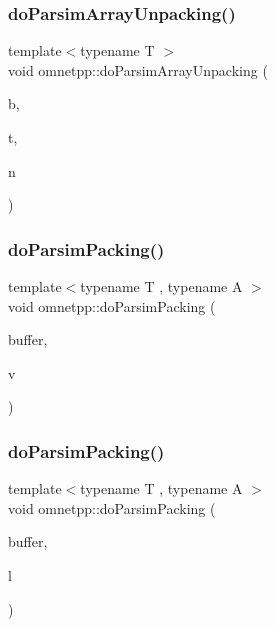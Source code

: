\mbox{\label{namespaceomnetpp_aace4e02d3cd181249cf81a4bf8827fa7}} 
\subsubsection{\texorpdfstring{do\+Parsim\+Array\+Unpacking()}{doParsimArrayUnpacking()}}
{\footnotesize\ttfamily template$<$typename T $>$ \\
void omnetpp\+::do\+Parsim\+Array\+Unpacking (\begin{DoxyParamCaption}\item[{omnetpp\+::c\+Comm\+Buffer $\ast$}]{b,  }\item[{T $\ast$}]{t,  }\item[{int}]{n }\end{DoxyParamCaption})}

\mbox{\label{namespaceomnetpp_aa55507da29724bc32cb1377349b22c87}} 
\subsubsection{\texorpdfstring{do\+Parsim\+Packing()}{doParsimPacking()}\hspace{0.1cm}{\footnotesize\ttfamily [1/5]}}
{\footnotesize\ttfamily template$<$typename T , typename A $>$ \\
void omnetpp\+::do\+Parsim\+Packing (\begin{DoxyParamCaption}\item[{omnetpp\+::c\+Comm\+Buffer $\ast$}]{buffer,  }\item[{const std\+::vector$<$ T, A $>$ \&}]{v }\end{DoxyParamCaption})}

\mbox{\label{namespaceomnetpp_a1043d9829c084411066b9e9469d75942}} 
\subsubsection{\texorpdfstring{do\+Parsim\+Packing()}{doParsimPacking()}\hspace{0.1cm}{\footnotesize\ttfamily [2/5]}}
{\footnotesize\ttfamily template$<$typename T , typename A $>$ \\
void omnetpp\+::do\+Parsim\+Packing (\begin{DoxyParamCaption}\item[{omnetpp\+::c\+Comm\+Buffer $\ast$}]{buffer,  }\item[{const std\+::list$<$ T, A $>$ \&}]{l }\end{DoxyParamCaption})}


